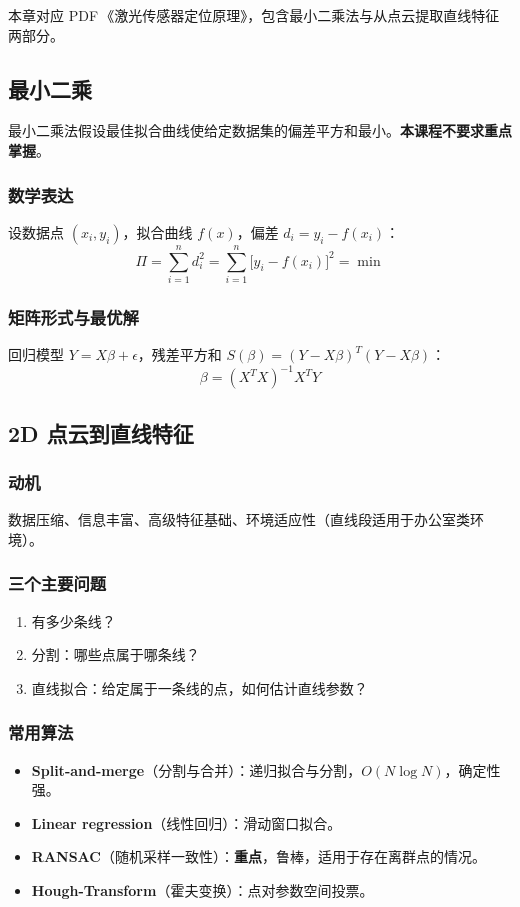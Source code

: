 \documentclass[11pt,a4paper]{article}
\begin{document}
\begin{keypoint}
本章对应 PDF\,《激光传感器定位原理》，包含最小二乘法与从点云提取直线特征两部分。
\end{keypoint}

\subsection{最小二乘}

\begin{notebox}
最小二乘法假设最佳拟合曲线使给定数据集的偏差平方和最小。\textbf{本课程不要求重点掌握}。
\end{notebox}

\subsubsection*{数学表达}
设数据点 $(x_i,y_i)$，拟合曲线 $f(x)$，偏差 $d_i=y_i-f(x_i)$：
\[
\Pi=\sum_{i=1}^n d_i^2=\sum_{i=1}^n\bigl[y_i-f(x_i)\bigr]^2=\min
\]

\subsubsection*{矩阵形式与最优解}
回归模型 $Y=X\beta+\epsilon$，残差平方和 $S(\beta)=(Y-X\beta)^T(Y-X\beta)$：
\[
\beta=(X^TX)^{-1}X^TY
\]

\subsection{2D 点云到直线特征}

\subsubsection*{动机}
数据压缩、信息丰富、高级特征基础、环境适应性（直线段适用于办公室类环境）。

\subsubsection*{三个主要问题}
\begin{enumerate}
  \item 有多少条线？
  \item 分割：哪些点属于哪条线？
  \item 直线拟合：给定属于一条线的点，如何估计直线参数？
\end{enumerate}

\subsubsection*{常用算法}
\begin{itemize}
  \item \textbf{Split-and-merge}（分割与合并）：递归拟合与分割，$O(N\log N)$，确定性强。
  \item \textbf{Linear regression}（线性回归）：滑动窗口拟合。
  \item \textbf{RANSAC}（随机采样一致性）：\textbf{重点}，鲁棒，适用于存在离群点的情况。
  \item \textbf{Hough-Transform}（霍夫变换）：点对参数空间投票。
\end{itemize}
\end{document}
